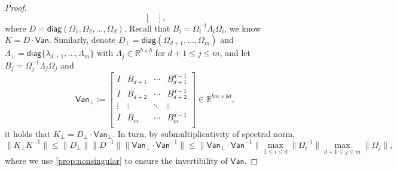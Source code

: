 \documentclass{article}
\newcommand{\defi}{:=}
\newcommand{\van}{\mathsf{Van}}
\newcommand{\R}{\mathbb{R}}
\providecommand{\diagm}{\mathsf{diag}}
\providecommand{\diagM}[1]{\mathsf{diag}(#1)}
\providecommand{\norm}[1]{\lVert#1\rVert}
\begin{document}
\begin{proof}
\begin{equation*}
\begin{bmatrix}
    \end{bmatrix},
\end{equation*}
where $D=\diagM{\Omega_{1},\Omega_{2},\dotsc,\Omega_{d}}$.
Recall that $B_{i} = \Omega_{i}^{-1}\Lambda_{i}\Omega_{i}$, we know $K = D\cdot\van$.
Similarly, denote $D_{\perp}=\diagM{\Omega_{d+1},\dotsc,\Omega_{m}}$ and $\Lambda_{\perp}=\diagm\{\lambda_{d+1},\dotsc,\Lambda_{m}\}$ with $\Lambda_{j}\in\R^{b\times b}$ for $d+1\leq j\leq m$, and let $B_{j}=\Omega_{j}^{-1}\Lambda_{j}\Omega_{j}$ and 
\begin{equation*}
    \van_{\perp} \defi
    \begin{bmatrix}
        I & B_{d+1} & \cdots & B_{d+1}^{d-1}\\ 
        I & B_{d+2} & \cdots & B_{d+2}^{d-1}\\ 
        \vdots & \vdots & \ddots & \vdots \\ 
        I & B_{m} & \cdots & B_{m}^{d-1}\\ 
    \end{bmatrix} \in\R^{bm\times bd},
\end{equation*}
it holds that $K_{\perp} = D_{\perp}\cdot\van_{\perp}$.   
In turn, by submultiplicativity of spectral norm, 
\begin{equation}
    \label{eq:pfthmmain2}
    \norm{K_{\perp}K^{-1}} \leq \norm{D_{\perp}}\norm{D^{-1}}\norm{\van_{\perp}\cdot\van^{-1}} \leq \norm{\van_{\perp}\cdot\van^{-1}} \max_{1\leq i\leq d}\norm{\Omega_{i}^{-1}}\max_{d+1\leq j\leq m}\norm{\Omega_{j}},
\end{equation}
where we use \cref{prop:nonsingular} to ensure the invertibility of $\van$. 



\end{proof}
\end{document}
